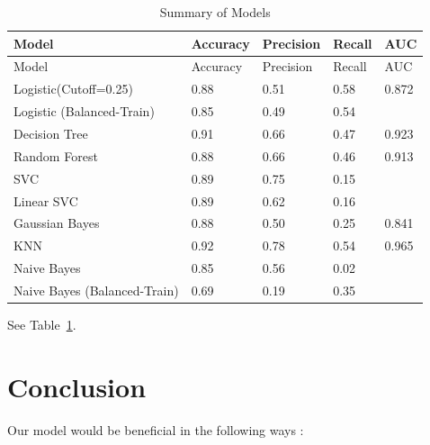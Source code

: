 \documentclass[
  letterpaper,
  DIV=11,
  numbers=noendperiod]{scrartcl}
\begin{document}
\hypertarget{tbl-letters}{}
\begin{longtable}[]{@{}lllll@{}}
\caption{\label{tbl-letters}Summary of Models}\tabularnewline
\toprule()
Model & Accuracy & Precision & Recall & AUC \\
\midrule()
\endfirsthead
\toprule()
Model & Accuracy & Precision & Recall & AUC \\
\midrule()
\endhead
Logistic(Cutoff=0.25) & 0.88 & 0.51 & 0.58 & 0.872 \\
Logistic (Balanced-Train) & 0.85 & 0.49 & 0.54 & \\
Decision Tree & 0.91 & 0.66 & 0.47 & 0.923 \\
Random Forest & 0.88 & 0.66 & 0.46 & 0.913 \\
SVC & 0.89 & 0.75 & 0.15 & \\
Linear SVC & 0.89 & 0.62 & 0.16 & \\
Gaussian Bayes & 0.88 & 0.50 & 0.25 & 0.841 \\
KNN & 0.92 & 0.78 & 0.54 & 0.965 \\
Naive Bayes & 0.85 & 0.56 & 0.02 & \\
Naive Bayes (Balanced-Train) & 0.69 & 0.19 & 0.35 & \\
\bottomrule()
\end{longtable}

See Table~\ref{tbl-letters}.

\hypertarget{conclusion}{%
\section{Conclusion}\label{conclusion}}

Our model would be beneficial in the following ways :
\end{document}
